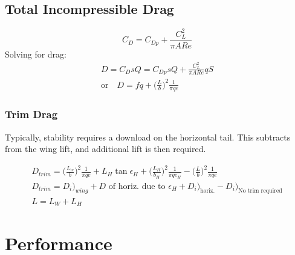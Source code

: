 \documentclass[draft=false, titlepage]{article}
\begin{document}
\subsection{Total Incompressible Drag}
\begin{equation}
C_D = C_{Dp} + \frac{C_L^2}{\pi AR e}
\end{equation}
Solving for drag:
\begin{gather*}
D = C_D sQ = C_{Dp} sQ + \frac{C_L^2}{\pi AR e}qS\\
\text{or} \quad D = fq + \Big(\frac{L}{b}\Big)^2 \frac{1}{\pi qe}
\end{gather*}
\subsubsection{Trim Drag}
Typically, stability requires a download on the horizontal tail. This subtracts from the wing lift, and additional lift is then required.

\begin{gather*}
D_{trim} = \Big(\frac{L_w}{b}\Big)^2 \frac{1}{\pi qe} + L_H\tan\epsilon_H + \Big(\frac{L_H}{b_H}\Big)^2 \frac{1}{\pi qe_H} - \Big(\frac{L}{b}\Big)^2 \frac{1}{\pi qe}\\
D_{trim} = D_i\Big)_{wing} + D \text{ of horiz. due to } \epsilon_H + D_i\Big)_{\text{horiz.}} - D_i\Big)_{\text{No trim required}}\\
L = L_W + L_H
\end{gather*}

\section{Performance}
\end{document}
